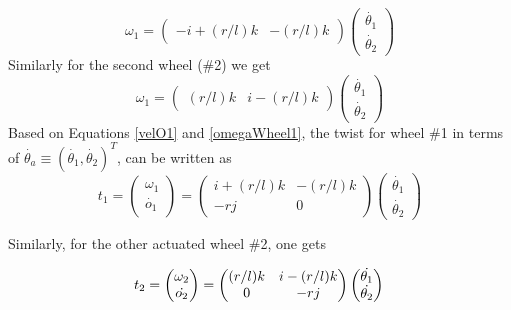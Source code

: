 \begin{equation}
\label{omegaWheel1}
{\omega_1}=\begin{pmatrix}
-i+(r/l)k & -(r/l)k
\end{pmatrix}
\begin{pmatrix}
\dot{\theta_1}\\\dot{\theta_2}
\end{pmatrix}
\end{equation}
Similarly for the second wheel (\#2) we get
\begin{equation}
\label{omegaWheel2}
{\omega_1}=\begin{pmatrix}
(r/l)k & i-(r/l)k
\end{pmatrix}
\begin{pmatrix}
\dot{\theta_1}\\\dot{\theta_2}
\end{pmatrix}
\end{equation}
Based on  Equations \ref{velO1} and \ref{omegaWheel1}, the twist for wheel \#1 in terms of $\dot{\theta_a}\equiv (\dot{\theta_1},\dot{\theta_2})^T$, can be written as 
\begin{equation}
\label{twist1}
t_1=\begin{pmatrix}
\omega_1\\\dot{o_1}
\end{pmatrix}=
\begin{pmatrix}
i+(r/l)k & -(r/l)k\\- rj & 0
\end{pmatrix}
\begin{pmatrix}
\dot{\theta_1}\\\dot{\theta_2}
\end{pmatrix}
\end{equation}

Similarly, for the other actuated wheel \#2, one gets

\begin{equation}
\label{twist2}
t_2=\begin{pmatrix}
\omega_2\\\dot{o_2}
\end{pmatrix}=
		\begin{pmatrix}
		(r/l)k & i-(r/l)k\\
		  0 & -rj
		\end{pmatrix}
		\begin{pmatrix}
		\dot{\theta_1}\\\dot{\theta_2}
		\end{pmatrix}\\
		\end{equation}

